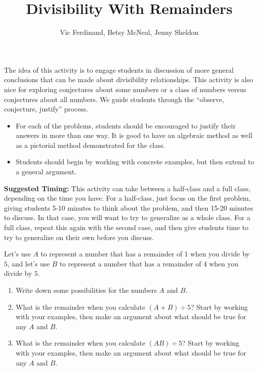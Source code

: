 \documentclass{ximera}
\title{Divisibility With Remainders}
\author{Vic Ferdinand, Betsy McNeal, Jenny Sheldon}
\begin{document}
\begin{abstract} \end{abstract}
\maketitle

\begin{instructorIntro}
The idea of this activity is to engage students in discussion of more general conclusions that can be made about divisibility relationships.  This activity is also nice for exploring conjectures about some numbers or a class of numbers versus conjectures about all numbers.  We guide students through the ``observe, conjecture, justify'' process.

\begin{itemize}
    \item For each of the problems, students should be encouraged to justify their answers in more than one way.  It is good to have an algebraic method as well as a pictorial method demonstrated for the class.
    \item Students should begin by working with concrete examples, but then extend to a general argument.
\end{itemize}

{\bf Suggested Timing:} This activity can take between a half-class and a full class, depending on the time you have.  For a half-class, just focus on the first problem, giving students 5-10 minutes to think about the problem, and then 15-20 minutes to discuss.  In that case, you will want to try to generalize as a whole class.  For a full class, repeat this again with the second case, and then give students time to try to generalize on their own before you discuss.

\end{instructorIntro}

\begin{problem} Let's use $A$ to represent a number that has a remainder of 1 when you divide by $5$, and let's use $B$ to represent a number that has a remainder of 4 when you divide by $5$.
\begin{enumerate}
\item Write down some possibilities for the numbers $A$ and $B$.
\item  What is the remainder when you calculate $(A + B) \div 5$?  Start by working with your examples, then make an argument about what should be true for any $A$ and $B$.
\item  What is the remainder when you calculate $(AB) \div 5$?  Start by working with your examples, then make an argument about what should be true for any $A$ and $B$.
\end{enumerate}
\end{problem}
\end{document}
